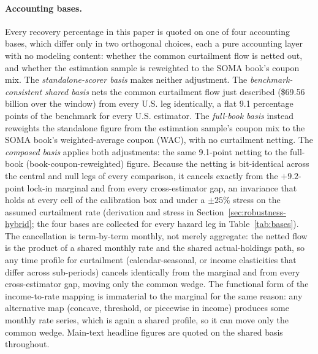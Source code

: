 \documentclass[12pt]{article}
\begin{document}
\paragraph{Accounting bases.} Every recovery percentage in this paper is quoted on one of four accounting bases, which differ only in two orthogonal choices, each a pure accounting layer with no modeling content: whether the common curtailment flow is netted out, and whether the estimation sample is reweighted to the SOMA book's coupon mix. The \emph{standalone-scorer basis} makes neither adjustment. The \emph{benchmark-consistent shared basis} nets the common curtailment flow just described (\$69.56 billion over the window) from every U.S. leg identically, a flat 9.1 percentage points of the benchmark for every U.S. estimator. The \emph{full-book basis} instead reweights the standalone figure from the estimation sample's coupon mix to the SOMA book's weighted-average coupon (WAC), with no curtailment netting. The \emph{composed basis} applies both adjustments: the same 9.1-point netting to the full-book (book-coupon-reweighted) figure. Because the netting is bit-identical across the central and null legs of every comparison, it cancels exactly from the $+9.2$-point lock-in marginal and from every cross-estimator gap, an invariance that holds at every cell of the calibration box and under a $\pm 25\%$ stress on the assumed curtailment rate (derivation and stress in Section~\ref{sec:robustness-hybrid}; the four bases are collected for every hazard leg in Table~\ref{tab:bases}). The cancellation is term-by-term monthly, not merely aggregate: the netted flow is the product of a shared monthly rate and the shared actual-holdings path, so any time profile for curtailment (calendar-seasonal, or income elasticities that differ across sub-periods) cancels identically from the marginal and from every cross-estimator gap, moving only the common wedge. The functional form of the income-to-rate mapping is immaterial to the marginal for the same reason: any alternative map (concave, threshold, or piecewise in income) produces some monthly rate series, which is again a shared profile, so it can move only the common wedge. Main-text headline figures are quoted on the shared basis throughout.
\end{document}
